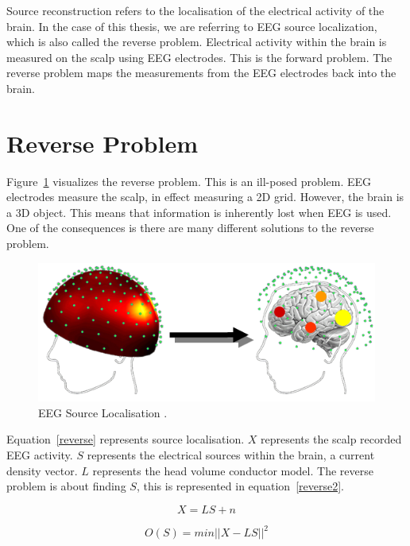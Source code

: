 Source reconstruction refers to the localisation of the electrical activity of the brain. In the case of this thesis, we are referring to EEG source localization, which is also called the reverse problem. Electrical activity within the brain is measured on the scalp using EEG electrodes. This is the forward problem. The reverse problem maps the measurements from the EEG electrodes back into the brain. \cite{schoffelen2009source}

\section{Reverse Problem}

Figure~\ref{source-local-img} visualizes the reverse problem. This is an ill-posed problem. EEG electrodes measure the scalp, in effect measuring a 2D grid. However, the brain is a 3D object. This means that information is inherently lost when EEG is used. One of the consequences is there are many different solutions to the reverse problem. 

\begin{figure}[!htb]
\caption{EEG Source Localisation \cite{source-loc-img}.}
\label{source-local-img}
    \centering
    \includegraphics[width=\textwidth]{fig/source_recon}
\end{figure}

Equation~\ref{reverse} represents source localisation. $X$ represents the scalp recorded EEG activity. $S$ represents the electrical sources within the brain, a current density vector. $L$ represents the head volume conductor model. The reverse problem is about finding $S$, this is represented in equation~\ref{reverse2}.

\begin{equation}\label{reverse}
X = LS + n
\end{equation}

\begin{equation}\label{reverse2}
O(S) = min||X - LS||^2 
\end{equation}

